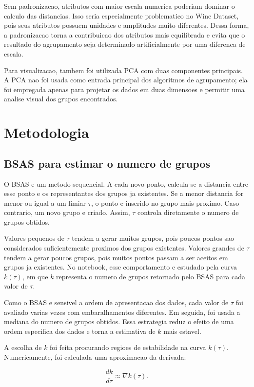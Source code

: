\documentclass[12pt,a4paper]{article}
\begin{document}
Sem padronizacao, atributos com maior escala numerica poderiam dominar o calculo
das distancias. Isso seria especialmente problematico no Wine Dataset, pois seus
atributos possuem unidades e amplitudes muito diferentes. Dessa forma, a
padronizacao torna a contribuicao dos atributos mais equilibrada e evita que o
resultado do agrupamento seja determinado artificialmente por uma diferenca de
escala.

Para visualizacao, tambem foi utilizada PCA com duas componentes principais. A
PCA nao foi usada como entrada principal dos algoritmos de agrupamento; ela foi
empregada apenas para projetar os dados em duas dimensoes e permitir uma analise
visual dos grupos encontrados.

\section{Metodologia}

\subsection{BSAS para estimar o numero de grupos}

O BSAS e um metodo sequencial. A cada novo ponto, calcula-se a distancia entre
esse ponto e os representantes dos grupos ja existentes. Se a menor distancia
for menor ou igual a um limiar $\tau$, o ponto e inserido no grupo mais proximo.
Caso contrario, um novo grupo e criado. Assim, $\tau$ controla diretamente o
numero de grupos obtidos.

Valores pequenos de $\tau$ tendem a gerar muitos grupos, pois poucos pontos sao
considerados suficientemente proximos dos grupos existentes. Valores grandes de
$\tau$ tendem a gerar poucos grupos, pois muitos pontos passam a ser aceitos em
grupos ja existentes. No notebook, esse comportamento e estudado pela curva
$k(\tau)$, em que $k$ representa o numero de grupos retornado pelo BSAS para
cada valor de $\tau$.

Como o BSAS e sensivel a ordem de apresentacao dos dados, cada valor de $\tau$
foi avaliado varias vezes com embaralhamentos diferentes. Em seguida, foi usada
a mediana do numero de grupos obtidos. Essa estrategia reduz o efeito de uma
ordem especifica dos dados e torna a estimativa de $k$ mais estavel.

A escolha de $k$ foi feita procurando regioes de estabilidade na curva
$k(\tau)$. Numericamente, foi calculada uma aproximacao da derivada:

\begin{equation}
    \frac{dk}{d\tau} \approx \nabla k(\tau).
\end{equation}
\end{document}
